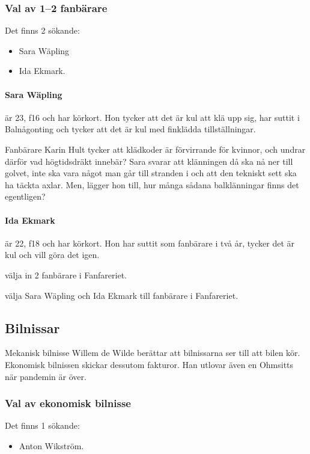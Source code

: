 \documentclass[hidelinks]{sektionsmote}
\begin{document}
\subsubsection{Val av 1--2 fanbärare}
Det finns 2 sökande:
\begin{itemize}
    \item Sara Wäpling
    \item Ida Ekmark.
\end{itemize}

\paragraph{Sara Wäpling} är 23, f16 och har körkort.
Hon tycker att det är kul att klä upp sig, har suttit i Balnågonting och tycker att det är kul med finklädda tillställningar.

Fanbärare Karin Hult tycker att klädkoder är förvirrande för kvinnor, och undrar därför vad högtidsdräkt innebär?
Sara svarar att klänningen då ska nå ner till golvet, inte ska vara något man går till stranden i och att den tekniskt sett ska ha täckta axlar.
Men, lägger hon till, hur många sådana balklänningar finns det egentligen?

\paragraph{Ida Ekmark} är 22, f18 och har körkort.
Hon har suttit som fanbärare i två år, tycker det är kul och vill göra det igen.

\begin{beslut}
  \item välja in 2 fanbärare i Fanfareriet.
  \item välja Sara Wäpling och Ida Ekmark till fanbärare i Fanfareriet.
\end{beslut}


\subsection{Bilnissar}
Mekanisk bilnisse Willem de Wilde berättar att bilnissarna ser till att bilen kör.
Ekonomisk bilnissen skickar dessutom fakturor.
Han utlovar även en Ohmsitts när pandemin är över.


\subsubsection{Val av ekonomisk bilnisse}
Det finns 1 sökande:
\begin{itemize}
    \item Anton Wikström.
\end{itemize}
\end{document}
